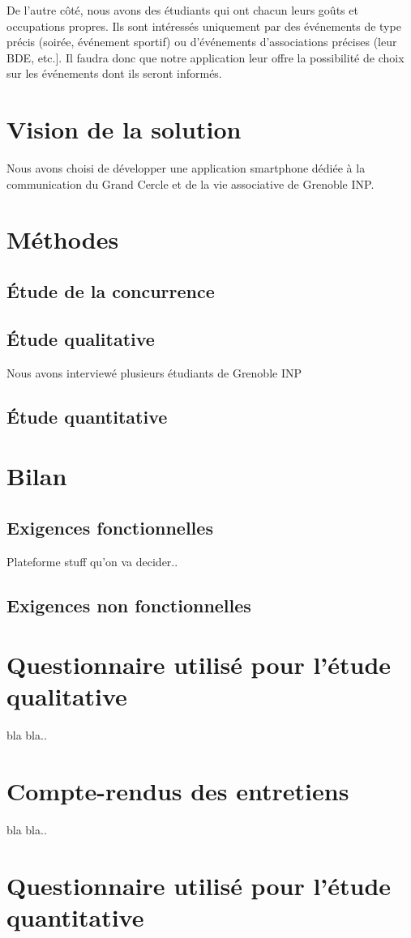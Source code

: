 \documentclass[a4paper, 11px]{article}
\begin{document}
De l'autre côté, nous avons des étudiants qui ont chacun leurs goûts et occupations propres. Ils sont intéressés uniquement par des événements de type précis (soirée, événement sportif) ou d'événements d'associations précises (leur BDE, etc.]. Il faudra donc que notre application leur offre la possibilité de choix sur les événements dont ils seront informés.


\newpage


\section{Vision de la solution}
Nous avons choisi de développer une application smartphone dédiée à la communication du Grand Cercle et de la vie associative de Grenoble INP.

\newpage

\section{Méthodes}

\subsection{Étude de la concurrence}

\subsection{Étude qualitative}
Nous avons interviewé plusieurs étudiants de Grenoble INP

\subsection{Étude quantitative}

\newpage

\section{Bilan}

\subsection{Exigences fonctionnelles}

Plateforme
stuff qu'on va decider..

\subsection{Exigences non fonctionnelles}


\appendix
\addappheadtotoc

\newpage

\section{Questionnaire utilisé pour l'étude qualitative}

bla bla..
\newpage

\section{Compte-rendus des entretiens}

bla bla..
\newpage

\section{Questionnaire utilisé pour l'étude quantitative}
\end{document}
